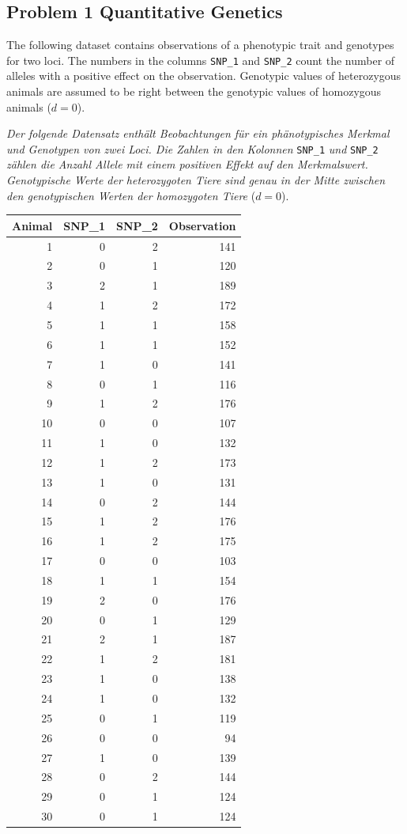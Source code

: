 \documentclass[
]{article}
\begin{document}
\clearpage
\pagebreak

\hypertarget{problem-1-quantitative-genetics}{%
\subsection{Problem 1 Quantitative
Genetics}\label{problem-1-quantitative-genetics}}

The following dataset contains observations of a phenotypic trait and
genotypes for two loci. The numbers in the columns \texttt{SNP\_1} and
\texttt{SNP\_2} count the number of alleles with a positive effect on
the observation. Genotypic values of heterozygous animals are assumed to
be right between the genotypic values of homozygous animals (\(d=0\)).

\textit{Der folgende Datensatz enthält Beobachtungen für ein phänotypisches Merkmal und Genotypen von zwei Loci. Die Zahlen in den Kolonnen }
\verb+SNP_1+ \textit{ und } \verb+SNP_2+
\textit{ zählen die Anzahl Allele mit einem positiven Effekt auf den Merkmalswert. Genotypische Werte der heterozygoten Tiere sind genau in der Mitte zwischen den genotypischen Werten der homozygoten Tiere}
(\(d=0\)).

\begin{longtable}[]{@{}rrrr@{}}
\toprule()
Animal & SNP\_1 & SNP\_2 & Observation \\
\midrule()
\endhead
1 & 0 & 2 & 141 \\
2 & 0 & 1 & 120 \\
3 & 2 & 1 & 189 \\
4 & 1 & 2 & 172 \\
5 & 1 & 1 & 158 \\
6 & 1 & 1 & 152 \\
7 & 1 & 0 & 141 \\
8 & 0 & 1 & 116 \\
9 & 1 & 2 & 176 \\
10 & 0 & 0 & 107 \\
11 & 1 & 0 & 132 \\
12 & 1 & 2 & 173 \\
13 & 1 & 0 & 131 \\
14 & 0 & 2 & 144 \\
15 & 1 & 2 & 176 \\
16 & 1 & 2 & 175 \\
17 & 0 & 0 & 103 \\
18 & 1 & 1 & 154 \\
19 & 2 & 0 & 176 \\
20 & 0 & 1 & 129 \\
21 & 2 & 1 & 187 \\
22 & 1 & 2 & 181 \\
23 & 1 & 0 & 138 \\
24 & 1 & 0 & 132 \\
25 & 0 & 1 & 119 \\
26 & 0 & 0 & 94 \\
27 & 1 & 0 & 139 \\
28 & 0 & 2 & 144 \\
29 & 0 & 1 & 124 \\
30 & 0 & 1 & 124 \\
\bottomrule()
\end{longtable}
\end{document}
